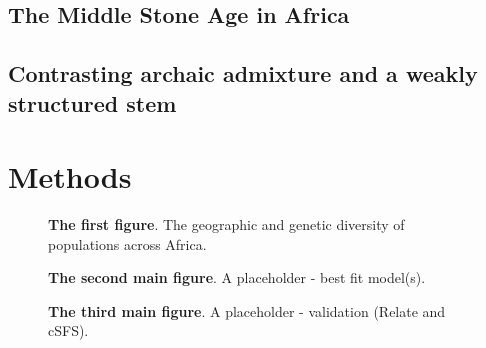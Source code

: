 \documentclass[]{article}
\begin{document}
\subsection*{The Middle Stone Age in Africa}

\subsection*{Contrasting archaic admixture and a weakly structured stem}

\section*{Methods}
\cite{Kelleher2016-lw}

\begin{figure}[ht]
\begin{center}
\caption{\textbf{The first figure}.
    The geographic and genetic diversity of populations across Africa.
}
\label{fig:1}
\end{center}
\end{figure}

\begin{figure}[ht]
\begin{center}
\makebox[\textwidth][c]{} %
\caption{\textbf{The second main figure}.
    A placeholder - best fit model(s).
}
\label{fig:2}
\end{center}
\end{figure}

\begin{figure}[ht]
\begin{center}
    \makebox[\textwidth][c]{} %
\caption{\textbf{The third main figure}.
    A placeholder - validation (Relate and cSFS).
}
\label{fig:r3}
\end{center}
\end{figure}
\end{document}
